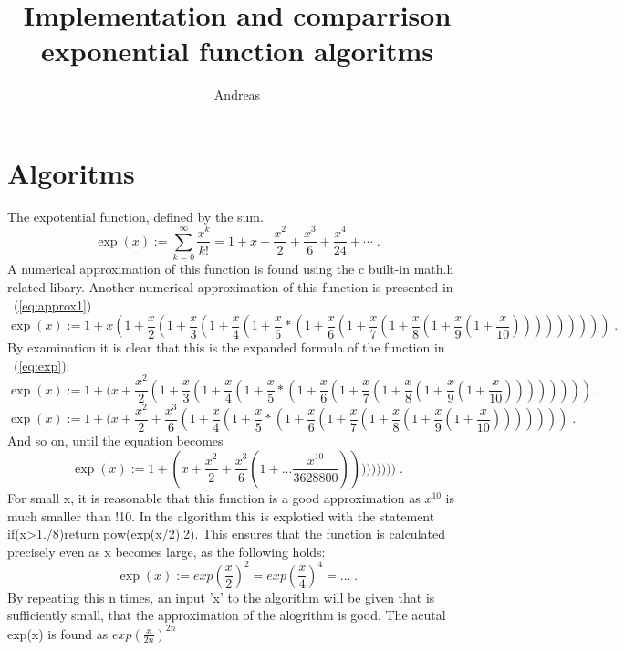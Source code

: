 \documentclass{article}
\title{Implementation and comparrison exponential function algoritms}
\author{Andreas}
\date{}
\begin{document}
\maketitle

\section{Algoritms}
The expotential function, defined by the sum. ~\cite{expref}
	\begin{equation}\label{eq:exp}
\exp (x) := \sum_{k = 0}^{\infty} \frac{x^k}{k!} = 1 + x + \frac{x^2}{2} + \frac{x^3}{6} + \frac{x^4}{24} + \cdots\;.
	\end{equation}
A numerical approximation of this function is found using the c built-in math.h related libary.
Another numerical approximation of this function is presented in ~(\ref{eq:approx1}) 
	\begin{equation}\label{eq:approx1}
\exp (x) := 1 + x(1+\frac{x}{2}(1+\frac{x}{3}(1+\frac{x}{4}(1+\frac{x}{5}*(1+\frac{x}{6}(1+\frac{x}{7}(1+\frac{x}{8}(1+\frac{x}{9}(1+\frac{x}{10})))))))))\;.
	\end{equation}
By examination it is clear that this is the expanded formula of the function in ~(\ref{eq:exp}):
	\begin{equation}\label{eq:deri1}
\exp (x) := 1 + (x+\frac{x^2}{2}(1+\frac{x}{3}(1+\frac{x}{4}(1+\frac{x}{5}*(1+\frac{x}{6}(1+\frac{x}{7}(1+\frac{x}{8}(1+\frac{x}{9}(1+\frac{x}{10}))))))))\;.
	\end{equation}
	\begin{equation}\label{eq:deri2}
\exp (x) := 1 + (x+\frac{x^2}{2}+\frac{x^3}{6}(1+\frac{x}{4}(1+\frac{x}{5}*(1+\frac{x}{6}(1+\frac{x}{7}(1+\frac{x}{8}(1+\frac{x}{9}(1+\frac{x}{10})))))))\;.
	\end{equation}
And so on, until the equation becomes 
	\begin{equation}\label{eq:deri2}
\exp (x) := 1 + (x+\frac{x^2}{2}+\frac{x^3}{6}(1+...\frac{x^{10}}{3628800})))))))))\;.
	\end{equation}
For small x, it is reasonable that this function is a good approximation as $x^{10}$ is much smaller than !10.
In the algorithm this is explotied with the statement if(x>1./8)return pow(exp(x/2),2). This ensures that the function
is calculated precisely even as x becomes large, as the following holds:
	\begin{equation}\label{eq:note1}
\exp (x) := exp(\frac{x}{2})^2=exp(\frac{x}{4})^4=...\;.
	\end{equation}
By repeating this n times, an input 'x' to the algorithm will be given that is sufficiently small, that the approximation of the alogrithm is good.
The acutal exp(x) is found as $exp(\frac{x}{2n})^{2n}$
\end{document}
